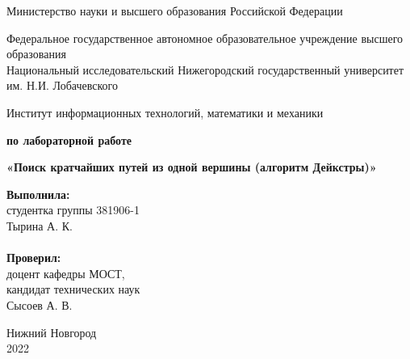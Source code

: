 \documentclass{report}
\begin{document}
\begin{titlepage}

\begin{center}
Министерство науки и высшего образования Российской Федерации
\end{center}

\begin{center}
Федеральное государственное автономное образовательное учреждение высшего образования \\
Национальный исследовательский Нижегородский государственный университет им. Н.И. Лобачевского
\end{center}

\begin{center}
Институт информационных технологий, математики и механики
\end{center}

\vspace{4em}

\begin{center}
\textbf{ по лабораторной работе} \\
\end{center}
\begin{center}
\textbf{\Large«Поиск кратчайших путей из одной вершины (алгоритм Дейкстры)»} \\
\end{center}

\vspace{4em}

\newbox{\lbox}
\newlength{\maxl}
\setlength{\maxl}{\wd\lbox}
\hfill\parbox{7cm}{
\hspace*{5cm}\hspace*{-5cm}\textbf{Выполнила:} \\ студентка группы 381906-1 \\ Тырина А. К.\\
\\
\hspace*{5cm}\hspace*{-5cm}\textbf{Проверил:}\\ доцент кафедры МОСТ, \\ кандидат технических наук \\ Сысоев А. В.\\
}
\vspace{\fill}

\begin{center} Нижний Новгород \\ 2022 \end{center}

\end{titlepage}
\end{document}
